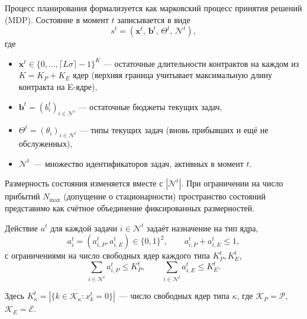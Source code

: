 \documentclass[14pt, oneside]{extbook}
\begin{document}
        Процесс планирования формализуется как марковский
        процесс принятия решений (MDP). Состояние в момент $t$
        записывается в виде
        \begin{equation*}
                s^t = (\mathbf{x}^t,\, \mathbf{b}^t,\,
                       \Theta^t,\, \mathcal{N}^t),
        \end{equation*}
        где
        \begin{itemize}
                \item $\mathbf{x}^t \in
                        \{0, \ldots, \lceil L\sigma\rceil - 1\}^K$
                        --- остаточные длительности контрактов на
                        каждом из $K = K_P + K_E$ ядер (верхняя
                        граница учитывает максимальную длину
                        контракта на E-ядре),
                \item $\mathbf{b}^t = (b_i^t)_{i \in \mathcal{N}^t}$
                        --- остаточные бюджеты текущих задач,
                \item $\Theta^t = (\theta_i)_{i \in \mathcal{N}^t}$
                        --- типы текущих задач (вновь прибывших и
                        ещё не обслуженных),
                \item $\mathcal{N}^t$~--- множество идентификаторов
                        задач, активных в момент $t$.
        \end{itemize}
        Размерность состояния изменяется вместе с
        $|\mathcal{N}^t|$. При ограничении на число прибытий
        $N_{\max}$ (допущение о стационарности) пространство
        состояний представимо как счётное объединение фиксированных
        размерностей.

        Действие $a^t$ для каждой задачи $i \in \mathcal{N}^t$
        задаёт назначение на тип ядра,
        \begin{equation*}
                a_i^t = (a_{i,P}^t, a_{i,E}^t) \in \{0,1\}^2,
                \qquad a_{i,P}^t + a_{i,E}^t \leq 1,
        \end{equation*}
        с ограничениями на число свободных ядер каждого типа
        $K_P^t, K_E^t$,
        \begin{equation*}
                \sum_{i \in \mathcal{N}^t} a_{i,P}^t \leq K_P^t,
                \qquad
                \sum_{i \in \mathcal{N}^t} a_{i,E}^t \leq K_E^t.
        \end{equation*}

        Здесь $K_\kappa^t = |\{k \in \mathcal{K}_\kappa :
        x_k^t = 0\}|$~--- число свободных ядер типа $\kappa$,
        где $\mathcal{K}_P = \mathcal{P}$,
        $\mathcal{K}_E = \mathcal{E}$.
\end{document}
